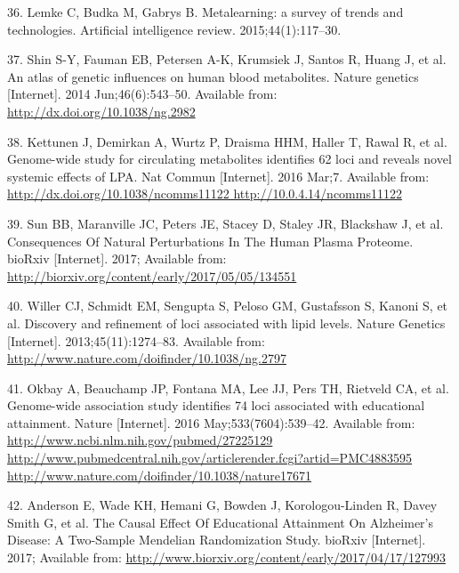 \documentclass[]{article}
\begin{document}
\hypertarget{ref-lemke2015metalearning}{}
36. Lemke C, Budka M, Gabrys B. Metalearning: a survey of trends and
technologies. Artificial intelligence review. 2015;44(1):117--30.

\hypertarget{ref-Shin2014}{}
37. Shin S-Y, Fauman EB, Petersen A-K, Krumsiek J, Santos R, Huang J, et
al. An atlas of genetic influences on human blood metabolites. Nature
genetics {[}Internet{]}. 2014 Jun;46(6):543--50. Available from:
\url{http://dx.doi.org/10.1038/ng.2982}

\hypertarget{ref-Kettunen2016}{}
38. Kettunen J, Demirkan A, Wurtz P, Draisma HHM, Haller T, Rawal R, et
al. Genome-wide study for circulating metabolites identifies 62 loci and
reveals novel systemic effects of LPA. Nat Commun {[}Internet{]}. 2016
Mar;7. Available from:
\href{http://dx.doi.org/10.1038/ncomms11122\%20http://10.0.4.14/ncomms11122}{http://dx.doi.org/10.1038/ncomms11122 http://10.0.4.14/ncomms11122}

\hypertarget{ref-Sun2017}{}
39. Sun BB, Maranville JC, Peters JE, Stacey D, Staley JR, Blackshaw J,
et al. Consequences Of Natural Perturbations In The Human Plasma
Proteome. bioRxiv {[}Internet{]}. 2017; Available from:
\url{http://biorxiv.org/content/early/2017/05/05/134551}

\hypertarget{ref-Willer2013}{}
40. Willer CJ, Schmidt EM, Sengupta S, Peloso GM, Gustafsson S, Kanoni
S, et al. Discovery and refinement of loci associated with lipid levels.
Nature Genetics {[}Internet{]}. 2013;45(11):1274--83. Available from:
\url{http://www.nature.com/doifinder/10.1038/ng.2797}

\hypertarget{ref-Okbay2016}{}
41. Okbay A, Beauchamp JP, Fontana MA, Lee JJ, Pers TH, Rietveld CA, et
al. Genome-wide association study identifies 74 loci associated with
educational attainment. Nature {[}Internet{]}. 2016
May;533(7604):539--42. Available from:
\href{http://www.ncbi.nlm.nih.gov/pubmed/27225129\%20http://www.pubmedcentral.nih.gov/articlerender.fcgi?artid=PMC4883595\%20http://www.nature.com/doifinder/10.1038/nature17671}{http://www.ncbi.nlm.nih.gov/pubmed/27225129 http://www.pubmedcentral.nih.gov/articlerender.fcgi?artid=PMC4883595 http://www.nature.com/doifinder/10.1038/nature17671}

\hypertarget{ref-Anderson2017}{}
42. Anderson E, Wade KH, Hemani G, Bowden J, Korologou-Linden R, Davey
Smith G, et al. The Causal Effect Of Educational Attainment On
Alzheimer's Disease: A Two-Sample Mendelian Randomization Study. bioRxiv
{[}Internet{]}. 2017; Available from:
\url{http://www.biorxiv.org/content/early/2017/04/17/127993}
\end{document}
